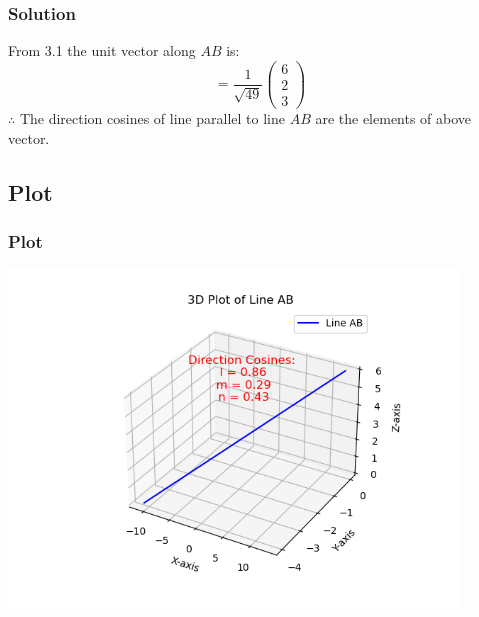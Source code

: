 \documentclass{beamer}
\theoremstyle{remark}
\numberwithin{equation}{section}
\begin{document}
\begin{frame}
\frametitle{Solution}

From 3.1 the unit vector along $AB$ is$\colon$\\
\begin{equation}
= \frac{1}{\sqrt{49}}\begin{pmatrix}
    6\\
    2\\
    3
\end{pmatrix}
\end{equation}
$\therefore$ The direction cosines of line parallel to line $AB$ are the elements of above vector.
\end{frame}

\subsection{Plot}
\begin{frame}
\frametitle{Plot}
    \begin{center}
\includegraphics[width=0.9\textwidth]{figs/figure1.png}
\end{center}
\end{frame}
\end{document}
